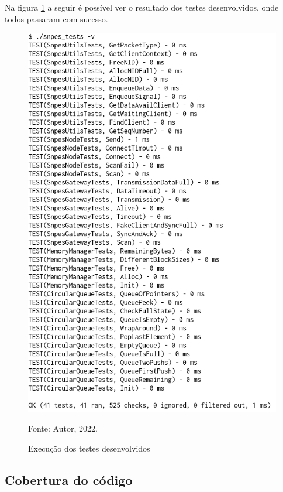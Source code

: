 Na figura \ref{fig:tests} a seguir é possível ver o resultado dos testes desenvolvidos,
onde todos passaram com sucesso.

\begin{figure}[H]
    \centering
	\caption{Execução dos testes desenvolvidos}
    \includegraphics[height=0.57\textheight,keepaspectratio]{img/tests.png}
    \label{fig:tests}
    
    Fonte: Autor, 2022.
\end{figure}

\newpage

\subsection{Cobertura do código}

